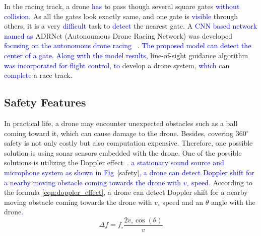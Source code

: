 In the racing track, a drone \textcolor{blue}{has} to pass though several square gates \textcolor{blue}{without collision}. As all the gates look exactly same, and one gate is \textcolor{blue}{visible} through others, it is a very \textcolor{blue}{difficult} task to \textcolor{blue}{detect} the nearest gate. A \textcolor{blue}{CNN based network named as} ADRNet (Autonoumous Drone Racing Network) was developed \textcolor{blue}{focusing on the autonomous drone racing }~\cite{jung2018perception}. \textcolor{blue}{The proposed model can detect the center of a gate.} \textcolor{blue}{Along with the model results,} line-of-sight guidance algorithm \textcolor{blue}{was incorporated for flight control, to}  develop a drone system, \textcolor{blue}{which} can \textcolor{blue}{complete} a race track. 

\subsection{Safety Features}
In practical life, a drone may encounter unexpected obstacles such as a ball coming toward it, which can cause damage to the drone. Besides, covering 360$^{\circ}$ safety is not only costly but also computation expensive. Therefore, one possible solution is using sonar sensors embedded with the drone. One of the possible solutions is utilizing the Doppler effect~\cite{garg2020enabling}.  \textcolor{blue}{a stationary sound source and microphone system as shown in Fig~\ref{safety}, a drone can detect Doppler shift for a nearby moving obstacle coming towards the drone with $v_{\circ}$ speed.} According to the formula \ref{eqn:doppler_effect}, a drone can detect Doppler shift for a nearby moving obstacle coming towards the drone with $v_{\circ}$ speed and an $\theta$ angle with the drone\textcolor{blue}{.}
\begin{equation}
\label{eqn:doppler_effect}
    \Delta f=f_{\circ} \frac{2 v_{\circ} \cos (\theta)}{v}
\end{equation}





